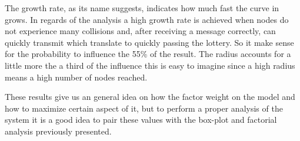\medskip
The growth rate, as its name suggests, indicates how much fast the curve in grows. In regards of the analysis a high growth rate is achieved when nodes do not experience many collisions and, after receiving a message correctly, can quickly transmit which translate to quickly passing the lottery. So it make sense for the probability to influence the 55\% of the result. The radius accounts for a little more the a third of the influence this is easy to imagine since a high radius means a high number of nodes reached.

\medskip
These results give us an general idea on how the factor weight on the model and how to maximize certain aspect of it, but to perform a proper analysis of the system it is a good idea to pair these values with the box-plot and factorial analysis previously presented.